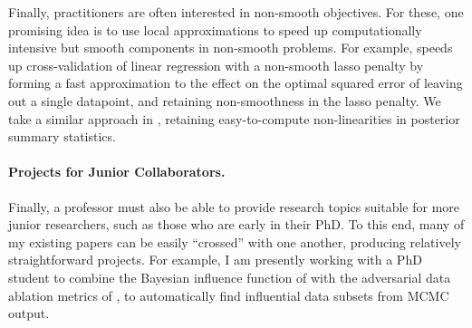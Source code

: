 Finally, practitioners are often interested in non-smooth objectives. For these,
one promising idea is to use local approximations to speed up computationally
intensive but smooth components in non-smooth problems. For example,
\citet{wilson:2020:approximatecv} speeds up cross-validation of linear
regression with a non-smooth lasso penalty by forming a fast approximation to
the effect on the optimal squared error of leaving out a single datapoint, and
retaining non-smoothness in the lasso penalty. We take a similar approach in
\citet{giordano:2021:bnpsensitivity}, retaining easy-to-compute non-linearities
in posterior summary statistics.


\paragraph{Projects for Junior Collaborators.}

Finally, a professor must also be able to provide research topics suitable for
more junior researchers, such as those who are early in their PhD.  To this end,
many of my existing papers can be easily ``crossed'' with one another, producing
relatively straightforward projects. For example, I am presently working with a
PhD student to combine the Bayesian influence function of
\citet{giordano:2021:bayesij} with the adversarial data ablation metrics of
\citet{giordano:2020:amip}, to automatically find influential data subsets from
MCMC output.


\newpage





